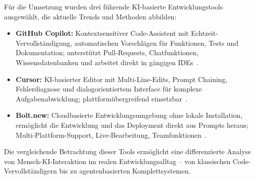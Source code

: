 Für die Umsetzung wurden drei führende KI-basierte Entwicklungstools
ausgewählt, die aktuelle Trends und Methoden abbilden:
\begin{itemize}
      \item \textbf{GitHub Copilot:} Kontextsensitiver Code-Assistent mit Echtzeit-Vervollständigung, automatischen Vorschlägen für Funktionen, Tests und Dokumentation; unterstützt Pull-Requests, Chatfunktionen, Wissensdatenbanken und arbeitet direkt in gängigen IDEs~\cite{github_copilot_2025}.
      \item \textbf{Cursor:} KI-basierter Editor mit Multi-Line-Edits, Prompt Chaining, Fehlerdiagnose und dialogorientiertem Interface für komplexe Aufgabenabwicklung; plattformübergreifend einsetzbar~\cite{cursor_welcome_2025}.
      \item \textbf{Bolt.new:} Cloudbasierte Entwicklungsumgebung ohne lokale Installation, ermöglicht die Entwicklung und das Deployment direkt aus Prompts heraus; Multi-Plattform-Support, Live-Bearbeitung, Teamfunktionen~\cite{bolt_support_2025}.
\end{itemize}

Die vergleichende Betrachtung dieser Tools ermöglicht eine differenzierte
Analyse von Mensch-KI-Interaktion im realen Entwicklungsalltag – von
klassischen Code-Vervollständigern bis zu agentenbasierten Komplettsystemen.